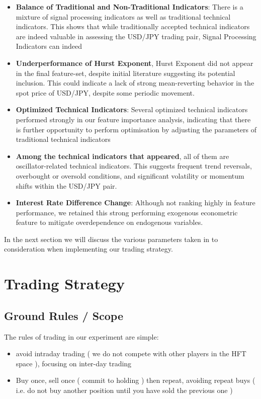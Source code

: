 \documentclass{article}
\begin{document}
\begin{itemize}
    \item \textbf {Balance of Traditional and Non-Traditional Indicators}: There is a mixture of signal processing indicators as well as traditional technical indicators. This shows that while traditionally accepted technical indicators are indeed valuable in assessing the USD/JPY trading pair, Signal Processing Indicators can indeed 
    \item \textbf{Underperformance of Hurst Exponent}, Hurst Exponent did not appear in the final feature-set, despite initial literature suggesting its potential inclusion. This could indicate a lack of strong mean-reverting behavior in the spot price of USD/JPY, despite some periodic movement.
    \item \textbf{Optimized Technical Indicators}: Several optimized technical indicators performed strongly in our feature importance analysis, indicating that there is further opportunity to perform optimisation by adjusting the parameters of traditional technical indicators
    \item \textbf{Among the technical indicators that appeared}, all of them are oscillator-related technical indicators. This suggests frequent trend reversals, overbought or oversold conditions, and significant volatility or momentum shifts within the USD/JPY pair.
    \item \textbf{Interest Rate Difference Change}: Although not ranking highly in feature performance, we retained this strong performing exogenous econometric feature to mitigate overdependence on endogenous variables.
\end{itemize}

\noindent In the next section we will discuss the various parameters taken in to consideration when implementing our trading strategy.
\newline
\newline
\newline
\section{Trading Strategy}
\subsection{Ground Rules / Scope}
The rules of trading in our experiment are simple:
\begin{itemize}
\item avoid intraday trading ( we do not compete with other players in the HFT space ), focusing on inter-day trading
\item Buy once, sell once ( commit to holding ) then repeat, avoiding repeat buys ( i.e. do not buy another position until you have sold the previous one )
\end{itemize}
\end{document}
